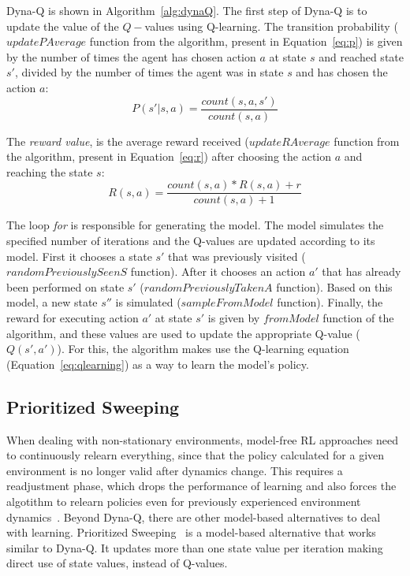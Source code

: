 Dyna-Q is shown in Algorithm~\ref{alg:dynaQ}. The first step of Dyna-Q is to update the value of the $Q-$values using Q-learning.
The transition probability ($updatePAverage$ function from the algorithm, present in Equation~\ref{eq:p}) is given by the number of times the agent has chosen action $a$ at state $s$ and reached state $s'$, divided by the number of times the agent was in state $s$ and has chosen the action $a$:
\begin{equation} \label{eq:p}
	P(s'|s,a) = \frac{count(s,a,s')}{count(s,a)}
\end{equation}

The \textit{reward value}, is the average reward received ($updateRAverage$ function from the algorithm, present in Equation~\ref{eq:r}) after choosing the action $a$ and reaching the state $s$:
\begin{equation} \label{eq:r}
	R(s,a) = \frac{count(s,a) * R(s,a) + r}{count(s,a) + 1}
\end{equation}

The loop \textit{for} is responsible for generating the model.
The model simulates the specified number of iterations and the Q-values are updated according to its model.
First it chooses a state $s'$ that was previously visited ($randomPreviouslySeenS$ function).
After it chooses an action $a'$ that has already been performed on state $s'$ ($randomPreviouslyTakenA$ function).
Based on this model, a new state $s''$ is simulated ($sampleFromModel$ function).
Finally, the reward for executing action $a'$ at state $s'$ is given by $fromModel$ function of the algorithm, and these values are used to update the appropriate Q-value ($Q(s',a')$).
For this, the algorithm makes use the Q-learning equation (Equation~\ref{eq:qlearning}) as a way to learn the model's policy.



\subsection{Prioritized Sweeping}
\label{subsec:ps}

When dealing with non-stationary environments, model-free RL approaches need to continuously relearn everything, since that the policy calculated for a given environment is no longer valid after dynamics change. 
This requires a readjustment phase, which drops the performance of learning and also forces the algotithm to relearn policies even for previously experienced environment dynamics~\cite{de2006reinforcement}.
Beyond Dyna-Q, there are other model-based alternatives to deal with learning.
Prioritized Sweeping~\cite{moore1993prioritized} is a model-based alternative that works similar to Dyna-Q.
It updates more than one state value per iteration making direct use of state values, instead of Q-values.

